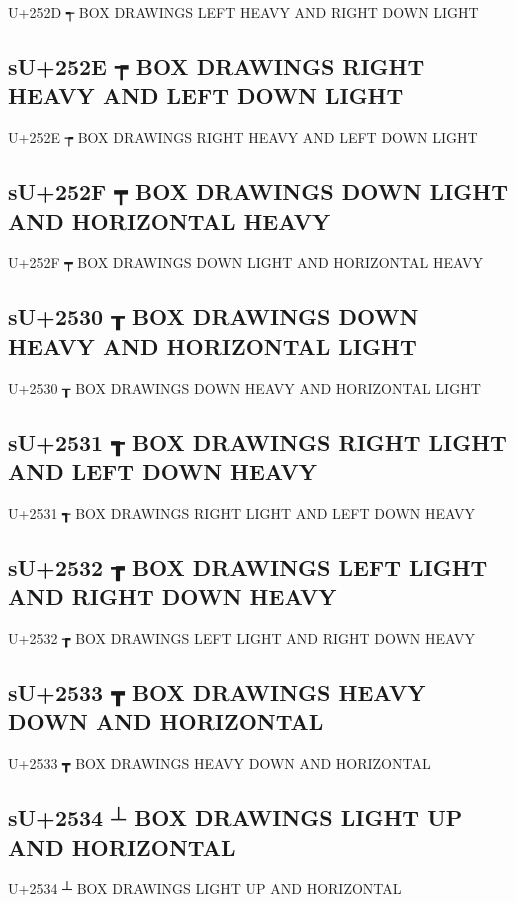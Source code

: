 U+252D ┭ BOX DRAWINGS LEFT HEAVY AND RIGHT DOWN LIGHT

\subsection{sU+252E ┮ BOX DRAWINGS RIGHT HEAVY AND LEFT DOWN LIGHT}

U+252E ┮ BOX DRAWINGS RIGHT HEAVY AND LEFT DOWN LIGHT

\subsection{sU+252F ┯ BOX DRAWINGS DOWN LIGHT AND HORIZONTAL HEAVY}

U+252F ┯ BOX DRAWINGS DOWN LIGHT AND HORIZONTAL HEAVY

\subsection{sU+2530 ┰ BOX DRAWINGS DOWN HEAVY AND HORIZONTAL LIGHT}

U+2530 ┰ BOX DRAWINGS DOWN HEAVY AND HORIZONTAL LIGHT

\subsection{sU+2531 ┱ BOX DRAWINGS RIGHT LIGHT AND LEFT DOWN HEAVY}

U+2531 ┱ BOX DRAWINGS RIGHT LIGHT AND LEFT DOWN HEAVY

\subsection{sU+2532 ┲ BOX DRAWINGS LEFT LIGHT AND RIGHT DOWN HEAVY}

U+2532 ┲ BOX DRAWINGS LEFT LIGHT AND RIGHT DOWN HEAVY

\subsection{sU+2533 ┳ BOX DRAWINGS HEAVY DOWN AND HORIZONTAL}

U+2533 ┳ BOX DRAWINGS HEAVY DOWN AND HORIZONTAL

\subsection{sU+2534 ┴ BOX DRAWINGS LIGHT UP AND HORIZONTAL}

U+2534 ┴ BOX DRAWINGS LIGHT UP AND HORIZONTAL

